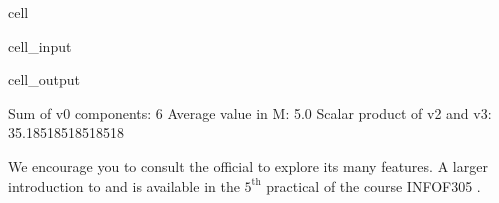 \documentclass[letterpaper,10pt,english]{jupyterBook}
\begin{document}
\begin{sphinxuseclass}{cell}\begin{sphinxVerbatimInput}

\begin{sphinxuseclass}{cell_input}
\begin{sphinxVerbatim}[commandchars=\\\{\}]
  
  
   
 
 
 
\end{sphinxVerbatim}

\end{sphinxuseclass}\end{sphinxVerbatimInput}
\begin{sphinxVerbatimOutput}

\begin{sphinxuseclass}{cell_output}
\begin{sphinxVerbatim}[commandchars=\\\{\}]
Sum of v0 components: 6
Average value in M: 5.0
Scalar product of v2 and v3: 35.18518518518518
\end{sphinxVerbatim}

\end{sphinxuseclass}\end{sphinxVerbatimOutput}

\end{sphinxuseclass}
\sphinxAtStartPar
We encourage you to consult the official  to explore its many features.
A larger introduction to  and  is available in the \(5^{\text{th}}\) practical of the course INFO\sphinxhyphen{}F305 \sphinxhyphen{} .
\end{document}
